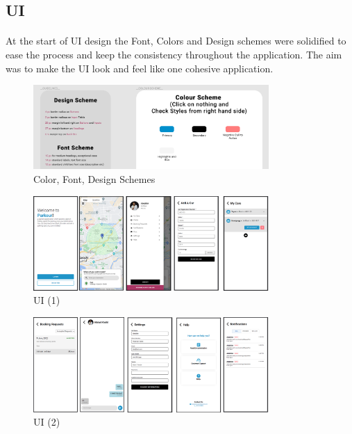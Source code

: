             \pagebreak
                \subsection{UI}
                \paragraph*{}
                    At the start of UI design the Font, Colors and Design schemes were solidified to ease the process and keep the consistency throughout the application. The aim was to make the UI look and feel like one cohesive application.

                    \begin{figure}[h]
                        \centering
                        \includegraphics[width=0.8\textwidth]{images/colorScheme.png}
                        \caption{Color, Font, Design Schemes}
                        \label{fig:colorScheme}
                    \end{figure}
    
                    \begin{figure}[h]
                        \centering
                        \includegraphics[width=0.8\textwidth]{images/ui1.png}
                        \caption{UI (1)}
                        \label{fig:ui1}
                    \end{figure}

                    \begin{figure}[h]
                        \centering
                        \includegraphics[width=0.8\textwidth]{images/ui2.png}
                        \caption{UI (2)}
                        \label{fig:ui2}
                    \end{figure}

